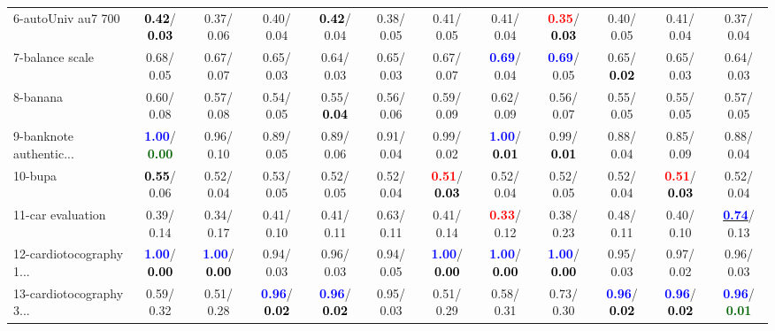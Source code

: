 \begin{table}[h]
\begin{center}
{\begin{tabular}{lc|c|c|c|c|c|c|c|c|c|c}
6-autoUniv au7 700 & \textcolor{black}{\textbf{  0.42}}/\textcolor{black}{\textbf{  0.03}} &   0.37/  0.06 &   0.40/  0.04 & \textcolor{black}{\textbf{  0.42}}/  0.04 &   0.38/  0.05 &   0.41/  0.05 &   0.41/  0.04 & \textcolor{red}{\textbf{  0.35}}/\textcolor{black}{\textbf{  0.03}} &   0.40/  0.05 &   0.41/  0.04 &   0.37/  0.04 \\
7-balance scale &   0.68/  0.05 &   0.67/  0.07 &   0.65/  0.03 &   0.64/  0.03 &   0.65/  0.03 &   0.67/  0.07 & \textcolor{blue}{\textbf{  0.69}}/  0.04 & \textcolor{blue}{\textbf{  0.69}}/  0.05 &   0.65/\textcolor{black}{\textbf{  0.02}} &   0.65/  0.03 &   0.64/  0.03 \\ \hline
8-banana &   0.60/  0.08 &   0.57/  0.08 &   0.54/  0.05 &   0.55/\textcolor{black}{\textbf{  0.04}} &   0.56/  0.06 &   0.59/  0.09 &   0.62/  0.09 &   0.56/  0.07 &   0.55/  0.05 &   0.55/  0.05 &   0.57/  0.05 \\
9-banknote authentic... & \textcolor{blue}{\textbf{  1.00}}/\textcolor{darkgreen}{\textbf{  0.00}} &   0.96/  0.10 &   0.89/  0.05 &   0.89/  0.06 &   0.91/  0.04 &   0.99/  0.02 & \textcolor{blue}{\textbf{  1.00}}/\textcolor{black}{\textbf{  0.01}} &   0.99/\textcolor{black}{\textbf{  0.01}} &   0.88/  0.04 &   0.85/  0.09 &   0.88/  0.04 \\
10-bupa & \textcolor{black}{\textbf{  0.55}}/  0.06 &   0.52/  0.04 &   0.53/  0.05 &   0.52/  0.05 &   0.52/  0.04 & \textcolor{red}{\textbf{  0.51}}/\textcolor{black}{\textbf{  0.03}} &   0.52/  0.04 &   0.52/  0.05 &   0.52/  0.04 & \textcolor{red}{\textbf{  0.51}}/\textcolor{black}{\textbf{  0.03}} &   0.52/  0.04 \\
11-car evaluation &   0.39/  0.14 &   0.34/  0.17 &   0.41/  0.10 &   0.41/  0.11 &   0.63/  0.11 &   0.41/  0.14 & \textcolor{red}{\textbf{  0.33}}/  0.12 &   0.38/  0.23 &   0.48/  0.11 &   0.40/  0.10 & \underline{\textcolor{blue}{\textbf{  0.74}}}/  0.13 \\
12-cardiotocography 1... & \textcolor{blue}{\textbf{  1.00}}/\textcolor{black}{\textbf{  0.00}} & \textcolor{blue}{\textbf{  1.00}}/\textcolor{black}{\textbf{  0.00}} &   0.94/  0.03 &   0.96/  0.03 &   0.94/  0.05 & \textcolor{blue}{\textbf{  1.00}}/\textcolor{black}{\textbf{  0.00}} & \textcolor{blue}{\textbf{  1.00}}/\textcolor{black}{\textbf{  0.00}} & \textcolor{blue}{\textbf{  1.00}}/\textcolor{black}{\textbf{  0.00}} &   0.95/  0.03 &   0.97/  0.02 &   0.96/  0.03 \\
13-cardiotocography 3... &   0.59/  0.32 &   0.51/  0.28 & \textcolor{blue}{\textbf{  0.96}}/\textcolor{black}{\textbf{  0.02}} & \textcolor{blue}{\textbf{  0.96}}/\textcolor{black}{\textbf{  0.02}} &   0.95/  0.03 &   0.51/  0.29 &   0.58/  0.31 &   0.73/  0.30 & \textcolor{blue}{\textbf{  0.96}}/\textcolor{black}{\textbf{  0.02}} & \textcolor{blue}{\textbf{  0.96}}/\textcolor{black}{\textbf{  0.02}} & \textcolor{blue}{\textbf{  0.96}}/\textcolor{darkgreen}{\textbf{  0.01}} \\

\end{tabular}}
\end{center}
\end{table}
